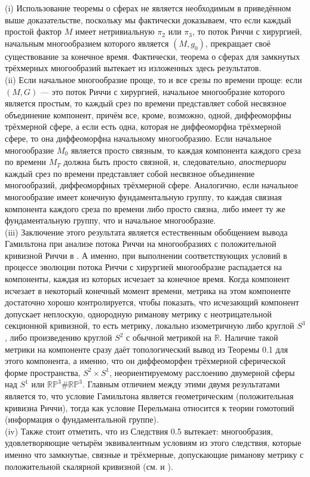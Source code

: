 \begin{remark} (i) Использование теоремы о сферах не является необходимым в приведённом 
выше доказательстве, поскольку мы фактически доказываем, что если каждый простой фактор 
$M$ имеет нетривиальную $\pi_{2}$ или $\pi_{3}$, то поток Риччи с хирургией, начальным многообразием 
которого является $(M,g_{0})$, прекращает своё существование за конечное время. Фактически, 
теорема о сферах для замкнутых трёхмерных многообразий вытекает из изложенных здесь результатов.\\
(ii) Если начальное многообразие проще, то и все срезы по времени проще: если $(M,G)$ — это 
поток Риччи с хирургией, начальное многообразие которого является простым, то каждый срез 
по времени представляет собой несвязное объединение компонент, причём все, кроме, возможно, 
одной, диффеоморфны трёхмерной сфере, а если есть одна, которая не диффеоморфна трёхмерной 
сфере, то она диффеоморфна начальному многообразию. Если начальное многообразие $M_{0}$   
является просто связным, то каждая компонента каждого среза по времени $M_{T}$ должна быть 
просто связной, и, следовательно, \textit{апостериори} каждый срез по времени представляет собой 
несвязное объединение многообразий, диффеоморфных трёхмерной сфере. Аналогично, если 
начальное многообразие имеет конечную фундаментальную группу, то каждая связная компонента 
каждого среза по времени либо просто связна, либо имеет ту же фундаментальную группу, что 
и начальное многообразие.\\
(iii) Заключение этого результата является естественным обобщением вывода Гамильтона при 
анализе потока Риччи на многообразиях с положительной кривизной Риччи в \cite{c29}. А именно, 
при выполнении соответствующих условий в процессе эволюции потока Риччи с хирургией 
многообразие распадается на компоненты, каждая из которых исчезает за конечное время. 
Когда компонент исчезает в некоторый конечный момент времени, метрика на этом компоненте 
достаточно хорошо контролируется, чтобы показать, что исчезающий компонент допускает 
неплоскую, однородную риманову метрику с неотрицательной секционной кривизной, то есть 
метрику, локально изометричную либо круглой $S^{3}$, либо произведению круглой $S^{2}$ с обычной 
метрикой на $\mathbb{R}$. Наличие такой метрики на компоненте сразу даёт топологический вывод из 
Теоремы 0.1 для этого компонента, а именно, что он диффеоморфен трёхмерной сферической 
форме пространства, $S^{2} \times S^{1}$, неориентируемому расслоению двумерной сферы над $S^{1}$ или 
$\mathbb{RP}^{3}\# \mathbb{RP}^{3}$. Главным отличием между этими двумя результатами является то, что условие 
Гамильтона является геометрическим (положительная кривизна Риччи), тогда как условие 
Перельмана относится к теории гомотопий (информация о фундаментальной группе).\\
(iv) Также стоит отметить, что из Следствия 0.5 вытекает: многообразия, удовлетворяющие 
четырём эквивалентным условиям из этого следствия, которые именно что замкнутые, связные и 
трёхмерные, допускающие риманову метрику с положительной скалярной 
кривизной (см. \cite{c62} и \cite{c26}).
\end{remark}

